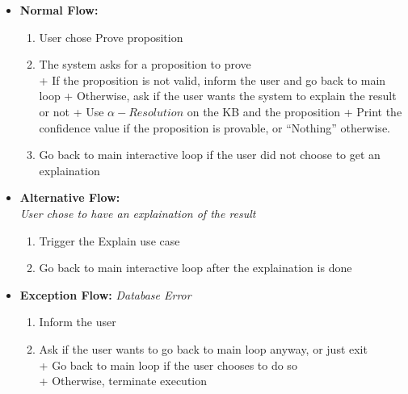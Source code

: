 \documentclass[../gr-final.tex]{subfiles}
\begin{document}
\begin{itemize}
  \item {\bfseries Normal Flow:}
    \begin{enumerate}
      \item User chose Prove proposition
      \item The system asks for a proposition to prove\\
      \indent + If the proposition is not valid, inform the user
      and go back to main loop
      \indent + Otherwise, ask if the user wants the system to
      explain the result or not
      \indent\indent + Use $\alpha-Resolution$ on the KB and the
      proposition
      \indent\indent + Print the confidence value if the
      proposition is provable, or ``Nothing'' otherwise.
    \item Go back to main interactive loop if the user did not
      choose to get an explaination
    \end{enumerate}
  \item {\bfseries Alternative Flow:}\\
    {\em User chose to have an explaination of the result}
    \begin{enumerate}
      \item Trigger the Explain use case
      \item Go back to main interactive loop after the
        explaination is done
    \end{enumerate}
  \item {\bfseries Exception Flow:} 
    {\em Database Error}
    \begin{enumerate}
      \item Inform the user
      \item Ask if the user wants to go back to main loop anyway,
        or just exit\\
        \indent + Go back to main loop if the user chooses to do
        so\\
        \indent + Otherwise, terminate execution
    \end{enumerate}
\end{itemize}
\end{document}
